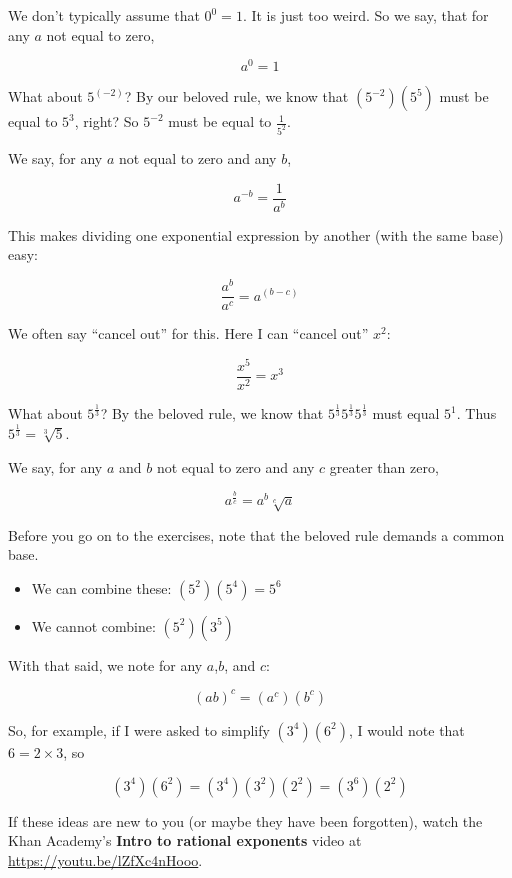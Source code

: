 We don't typically assume that $0^0 = 1$. It is just too
weird. So we say, that for any $a$ not equal to zero,

$$a^0 = 1$$

What about $5^{(-2)}$?  By our beloved rule, we know that
$\left(5^{-2}\right)\left(5^5\right)$ must be equal to $5^3$, right?
So $5^{-2}$ must be equal to $\frac{1}{5^2}$.

We say, for any $a$ not equal to zero and any $b$,

$$a^{-b} = \frac{1}{a^{b}}$$

This makes dividing one exponential expression by another (with the same base) easy:

$$\frac{a^b}{a^c} = a^{(b-c)}$$

We often say ``cancel out'' for this.  Here I can ``cancel out'' $x^2$:

$$\frac{x^5}{x^2} = x^3$$

What about $5^{\frac{1}{3}}$? By the beloved rule, we know that $5^{\frac{1}{3}}5^{\frac{1}{3}}5^{\frac{1}{3}}$ must equal $5^1$. Thus $5^{\frac{1}{3}} = \sqrt[3]{5}$.

We say, for any $a$ and $b$ not equal to zero and any $c$ greater than zero,

$$a^{\frac{b}{c}} = a^b \sqrt[c]{a}$$

Before you go on to the exercises, note that the beloved rule demands a common base.
\begin{itemize}
\item We can combine these: $\left(5^2\right)\left(5^4\right) = 5^6$
\item We cannot combine: $\left(5^2\right)\left(3^5\right)$
\end{itemize}

With that said, we note for any $a$,$b$, and $c$:

$$\left(ab\right)^c = \left(a^c\right) \left(b^c\right)$$

So, for example, if I were asked to simplify
$\left(3^4\right)\left(6^2\right)$, I would note that $6 = 2 \times
3$, so

$$\left(3^4\right)\left(6^2\right) = \left(3^4\right)\left(3^2\right)\left(2^2\right)  = \left(3^6\right)\left(2^2\right)$$


If these ideas are new to you (or maybe they have been forgotten),
watch the Khan Academy's \textbf{Intro to rational exponents} video at
\url{https://youtu.be/lZfXc4nHooo}.

